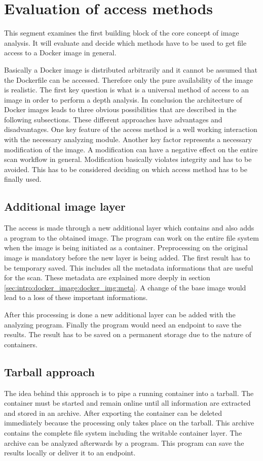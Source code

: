 \section{Evaluation of access methods}
\label{ch:theory:access_eval}
This segment examines the first building block of the core concept of image analysis.
It will evaluate and decide which methods have to be used to get file access to a Docker image in general.

Basically a Docker image is distributed arbitrarily and it cannot be assumed that the Dockerfile can be accessed.
Therefore only the pure availability of the image is realistic.
The first key question is what is a universal method of access to an image in order to perform a depth analysis.
In conclusion the architecture of Docker images leads to three obvious possibilities that are described in the following subsections.
These different approaches have advantages and disadvantages.
One key feature of the access method is a well working interaction with the necessary analyzing module.
Another key factor represents a necessary modification of the image. 
A modification can have a negative effect on the entire scan workflow in general.
Modification basically violates integrity and has to be avoided.
This has to be considered deciding on which access method has to be finally used.

\subsection{Additional image layer} 
\label{ch:theory:access_eval:additional}
The access is made through a new additional layer which contains and also adds a program to the obtained image. 
The program can work on the entire file system when the image is being initiated as a container.
Preprocessing on the original image is mandatory before the new layer is being added. 
The first result has to be temporary saved. 
This includes all the metadata informations that are useful for the scan. 
These metadata are explained more deeply in section \ref{sec:intro:docker_image:docker_img:meta}. 
A change of the base image would lead to a loss of these important informations.

After this processing is done a new additional layer can be added with the analyzing program.
Finally the program would need an endpoint to save the results. 
The result has to be saved on a permanent storage due to the nature of containers.

\subsection{Tarball approach} 
\label{ch:theory:access_eval:tarball}
The idea behind this approach is to pipe a running container into a tarball. The container must be started and remain online until all information are extracted and stored in an archive.
After exporting the container can be deleted immediately because the processing only takes place on the tarball.
This archive contains the complete file system including the writable container layer. The archive can be analyzed afterwards by a program. This program can save the results locally or deliver it to an endpoint.

